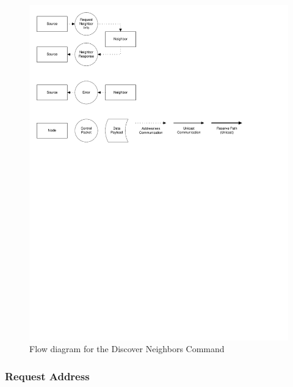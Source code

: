 \begin{figure}[ptb]
	\begin{centering}
		\includegraphics{Protocol/Figures/protocol-discover_neighbors.pdf}
		\caption{Flow diagram for the Discover Neighbors Command}
		\label{fig:protocol:discover_neighbors}
	\end{centering}
\end{figure}

\subsubsection{Request Address}\label{ref:protocol:methodology:commands:request_address}

